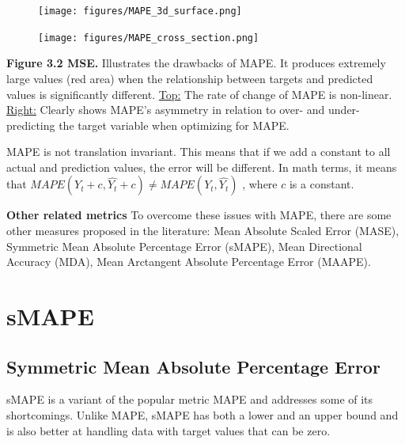 \clearpage

\thispagestyle{customstyle}

\begin{figure}[ht!]
    \centering
    \texttt{[image: figures/MAPE\_3d\_surface.png]}
\end{figure}

\begin{figure}
    \centering
    \vspace{-10pt} %
    \texttt{[image: figures/MAPE\_cross\_section.png]} %
    \vspace{-10pt} %
\end{figure}


\textbf{Figure 3.2 MSE.} Illustrates the drawbacks of MAPE. It produces extremely large values (red area) when the relationship between
targets and predicted values is significantly different. \underline{Top:} The rate of change of MAPE is non-linear.
\underline{Right:} Clearly shows MAPE's asymmetry in relation to over- and under-predicting the target variable when optimizing for MAPE.

{MAPE is not translation invariant. This means that if we add a constant to all actual and prediction values, the error will be different.
In math terms, it means that $MAPE(Y_{t} + c, \hat{Y_{t}} + c) \not= MAPE(Y_{t}, \hat{Y_{t}})$ , where $c$ is a constant.}


\textbf{Other related metrics}
To overcome these issues with MAPE, there are some other measures proposed in the literature: Mean Absolute Scaled Error (MASE),
Symmetric Mean Absolute Percentage Error (sMAPE), Mean Directional Accuracy (MDA), Mean Arctangent Absolute Percentage Error (MAAPE).

\clearpage
\thispagestyle{regressionstyle}
\section{sMAPE}
\subsection{Symmetric Mean Absolute Percentage Error}

sMAPE is a variant of the popular metric MAPE and addresses some of its shortcomings. Unlike MAPE, sMAPE has both a lower and an upper bound and is also better
at handling data with target values that can be zero.

